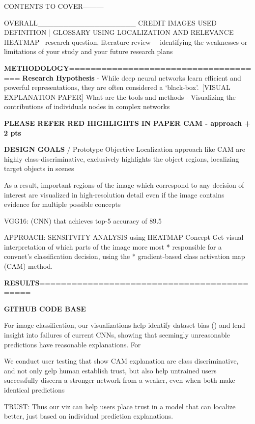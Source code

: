 CONTENTS TO COVER---------

OVERALL___________________
CREDIT IMAGES USED
DEFINITION | GLOSSARY
USING LOCALIZATION AND RELEVANCE HEATMAP
 research question, literature review 
 identifying the weaknesses or limitations of your study and your future research plans

\textbf{METHODOLOGY}=====================================
\textbf{Research Hypothesis}
- While deep neural networks learn efficient and powerful representations, they are often considered a ‘black-box’. [VISUAL EXPLANATION PAPER] What are the tools and methods 
- Visualizing the contributions of individuals nodes in complex networks

\textbf{PLEASE REFER RED HIGHLIGHTS IN PAPER CAM - approach + 2 pts}

\textbf{DESIGN GOALS} / Prototype Objective
Localization approach like CAM are highly class-discriminative, exclusively highlights the object regions, localizing target objects in scenes

As a result, important regions of the image which correspond
to any decision of interest are visualized in high-resolution
detail even if the image contains evidence for multiple possible concepts

VGG16: (CNN) that achieves top-5 accuracy of 89.5%

APPROACH: SENSITVITY ANALYSIS using HEATMAP Concept
Get visual interpretation of which parts of the image more most
 *    responsible for a convnet's classification decision, using the
 *    gradient-based class activation map (CAM) method.


\textbf{RESULTS}============================================

\textbf{GITHUB CODE BASE}

For image classification, our visualizations help identify dataset bias () and lend insight into failures of current CNNs, showing that seemingly unreasonable predictions have reasonable explanations. For

We conduct user testing that show CAM explanation are class discriminative, and not only gelp  human establish trust, but also help untrained users successfully discern a stronger network from a weaker, even when both make identical predictions

TRUST: Thus our viz can help users place trust in a model that can localize better, just based on individual prediction explanations.

